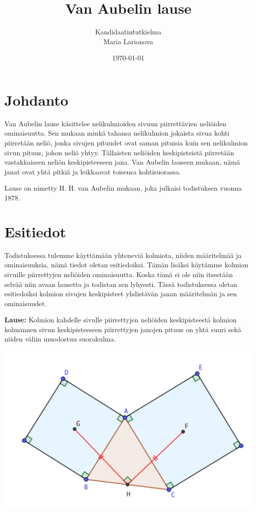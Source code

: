 \documentclass{scrartcl}
\title{Van Aubelin lause}
\author{Kandidaatintutkielma\\Maria Larionova}
\date{\today}
\begin{document}
\maketitle
\pagebreak
\tableofcontents
\pagebreak


\section{Johdanto}
Van Aubelin lause käsittelee nelikulmioiden sivuun piirrettävien neliöiden ominaisuutta. Sen mukaan minkä tahansa nelikulmion jokaista sivua kohti piirretään neliö, jonka sivujen pituudet ovat saman pituisia kuin sen nelikulmion sivun pituus, johon neliö yhtyy. Tällaisten neliöiden keskipisteistä piirretään vastakkaiseen neliön keskipisteeseen jana. Van Aubelin lauseen mukaan, nämä janat ovat yhtä pitkiä ja leikkaavat toisensa kohtisuorassa. 

Lause on nimetty H. H. van Aubelin mukaan, joka julkaisi todistuksen vuonna 1878.

\pagebreak
\section{Esitiedot}
Todistuksessa tulemme käyttämään yhteneviä kolmiota, niiden määritelmää ja ominaisuuksia, nämä tiedot oletan esitiedoiksi. Tämän lisäksi käytämme kolmion sivuille piirrettyjen neliöiden ominaisuutta. Koska tämä ei ole niin itsestään selvää niin avaan lausetta ja todistan sen lyhyesti. Tässä todistuksessa oletan esitiedoiksi kolmion sivujen keskipisteet yhdistävän janan määritelmän ja sen ominaisuudet.

\medskip
\textbf{Lause:} Kolmion kahdelle sivulle piirrettyjen neliöiden keskipisteestä kolmion kolmannen sivun keskipisteeseen piirrettyjen janojen pituus on yhtä suuri sekä niiden väliin muodostuu suorakulma.
\begin{center}
    \includegraphics[scale=0.6]{kolmiotodistus.png}
\end{center}
\end{document}
